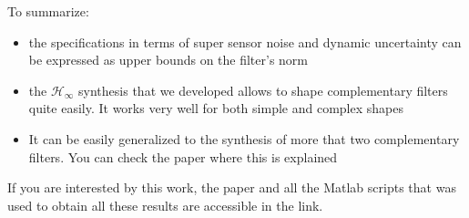 \documentclass[hangsection=false, titlepage=false, tocnp=false]{cleanreport}
\begin{document}
To summarize:
\begin{itemize}
\item the specifications in terms of super sensor noise and dynamic uncertainty can be expressed as upper bounds on the filter's norm
\item the \(\mathcal{H}_\infty\) synthesis that we developed allows to shape complementary filters quite easily. It works very well for both simple and complex shapes
\item It can be easily generalized to the synthesis of more that two complementary filters. You can check the paper where this is explained
\end{itemize}

If you are interested by this work, the paper and all the Matlab scripts that was used to obtain all these results are accessible in the link.
\end{document}
